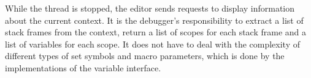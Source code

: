 While the thread is stopped, the editor sends requests to display information about the current context. It is the debugger's responsibility to extract a list of stack frames from the context, return a list of scopes for each stack frame and a list of variables for each scope. It does not have to deal with the complexity of different types of set symbols and macro parameters, which is done by the implementations of the variable interface.


